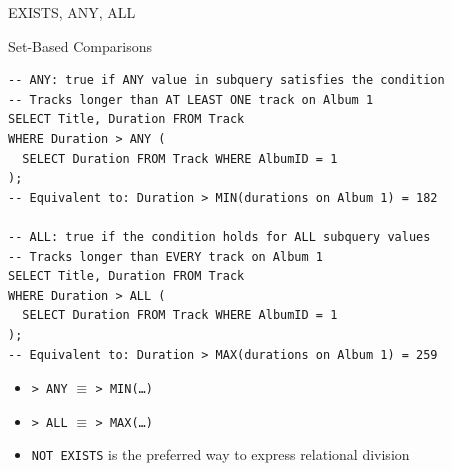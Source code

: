 \begin{frame}[fragile]{EXISTS, ANY, ALL}
  \begin{block}{Set-Based Comparisons}
\begin{lstlisting}[style=sqlstyle]
-- ANY: true if ANY value in subquery satisfies the condition
-- Tracks longer than AT LEAST ONE track on Album 1
SELECT Title, Duration FROM Track
WHERE Duration > ANY (
  SELECT Duration FROM Track WHERE AlbumID = 1
);
-- Equivalent to: Duration > MIN(durations on Album 1) = 182

-- ALL: true if the condition holds for ALL subquery values
-- Tracks longer than EVERY track on Album 1
SELECT Title, Duration FROM Track
WHERE Duration > ALL (
  SELECT Duration FROM Track WHERE AlbumID = 1
);
-- Equivalent to: Duration > MAX(durations on Album 1) = 259
\end{lstlisting}
  \end{block}

  \begin{itemize}
    \item \texttt{> ANY} $\equiv$ \texttt{> MIN(\ldots)}
    \item \texttt{> ALL} $\equiv$ \texttt{> MAX(\ldots)}
    \item \texttt{NOT EXISTS} is the preferred way to express relational division
  \end{itemize}
\end{frame}
